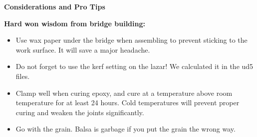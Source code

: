 \documentclass[11pt]{article}
\begin{document}
\begin{center}
    \LARGE \textbf{Considerations and Pro Tips}
\end{center}
\bigskip

\textbf{Hard won wisdom from bridge building:}
\begin{itemize}
    \item Use wax paper under the bridge when assembling to prevent sticking to the work surface. It will save a major headache.
    \item Do not forget to use the kerf setting on the lazar! We calculated it in the ud5 files.
    \item Clamp well when curing epoxy, and cure at a temperature above room temperature for at least 24 hours. Cold temperatures will prevent proper curing and weaken the joints significantly.
    \item Go with the grain. Balsa is garbage if you put the grain the wrong way.
\end{itemize}
\end{document}
